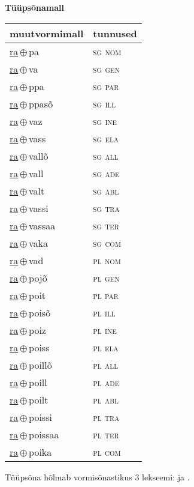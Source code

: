 

\vspace{3.5em}
\noindent \begin{minipage}{\textwidth}
\noindent \textbf{Tüüpsõnamall \,}\\

\begin{sideways}
\begin{tabular}{l l}
muutvormimall & tunnused \\
\hline
\underline{ra}\,$\oplus$\,pa & \textsc{ sg nom } \\
\underline{ra}\,$\oplus$\,va & \textsc{ sg gen } \\
\underline{ra}\,$\oplus$\,ppa & \textsc{ sg par } \\
\underline{ra}\,$\oplus$\,ppasõ & \textsc{ sg ill } \\
\underline{ra}\,$\oplus$\,vaz & \textsc{ sg ine } \\
\underline{ra}\,$\oplus$\,vass & \textsc{ sg ela } \\
\underline{ra}\,$\oplus$\,vallõ & \textsc{ sg all } \\
\underline{ra}\,$\oplus$\,vall & \textsc{ sg ade } \\
\underline{ra}\,$\oplus$\,valt & \textsc{ sg abl } \\
\underline{ra}\,$\oplus$\,vassi & \textsc{ sg tra } \\
\underline{ra}\,$\oplus$\,vassaa & \textsc{ sg ter } \\
\underline{ra}\,$\oplus$\,vaka & \textsc{ sg com } \\
\underline{ra}\,$\oplus$\,vad & \textsc{ pl nom } \\
\underline{ra}\,$\oplus$\,pojõ & \textsc{ pl gen } \\
\underline{ra}\,$\oplus$\,poit & \textsc{ pl par } \\
\underline{ra}\,$\oplus$\,poisõ & \textsc{ pl ill } \\
\underline{ra}\,$\oplus$\,poiz & \textsc{ pl ine } \\
\underline{ra}\,$\oplus$\,poiss & \textsc{ pl ela } \\
\underline{ra}\,$\oplus$\,poillõ & \textsc{ pl all } \\
\underline{ra}\,$\oplus$\,poill & \textsc{ pl ade } \\
\underline{ra}\,$\oplus$\,poilt & \textsc{ pl abl } \\
\underline{ra}\,$\oplus$\,poissi & \textsc{ pl tra } \\
\underline{ra}\,$\oplus$\,poissaa & \textsc{ pl ter } \\
\underline{ra}\,$\oplus$\,poika & \textsc{ pl com } \\
\end{tabular}
\end{sideways}
\label{tab:tüüpsõnamall-rapa}

\end{minipage}

 
\vspace{1em}
\noindent Tüüpsõna hõlmab vormisõnastikus 3 lekseemi:  ja .
